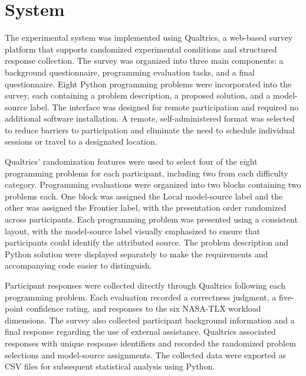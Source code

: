 \documentclass[manuscript,review]{acmart}
\begin{document}
\section{System}

The experimental system was implemented using Qualtrics, a web-based survey platform that supports randomized experimental conditions and structured response collection. The survey was organized into three main components: a background questionnaire, programming evaluation tasks, and a final questionnaire. Eight Python programming problems were incorporated into the survey, each containing a problem description, a proposed solution, and a model-source label. The interface was designed for remote participation and required no additional software installation. A remote, self-administered format was selected to reduce barriers to participation and eliminate the need to schedule individual sessions or travel to a designated location.

Qualtrics' randomization features were used to select four of the eight programming problems for each participant, including two from each difficulty category. Programming evaluations were organized into two blocks containing two problems each. One block was assigned the Local model-source label and the other was assigned the Frontier label, with the presentation order randomized across participants. Each programming problem was presented using a consistent layout, with the model-source label visually emphasized to ensure that participants could identify the attributed source. The problem description and Python solution were displayed separately to make the requirements and accompanying code easier to distinguish.

Participant responses were collected directly through Qualtrics following each programming problem. Each evaluation recorded a correctness judgment, a five-point confidence rating, and responses to the six NASA-TLX workload dimensions. The survey also collected participant background information and a final response regarding the use of external assistance. Qualtrics associated responses with unique response identifiers and recorded the randomized problem selections and model-source assignments. The collected data were exported as CSV files for subsequent statistical analysis using Python.


\end{document}
